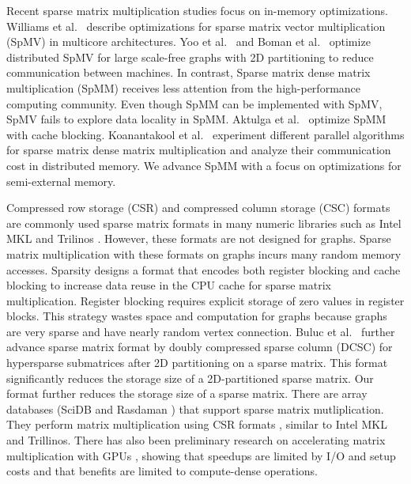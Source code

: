 Recent sparse matrix multiplication studies focus on in-memory optimizations.
Williams et al.~\cite{Williams07} describe optimizations for sparse matrix
vector multiplication (SpMV) in multicore architectures. Yoo et al.~\cite{Yoo11}
and Boman et al.~\cite{Boman2013} optimize distributed SpMV for large
scale-free graphs with 2D partitioning to reduce communication between
machines. In contrast, Sparse matrix dense matrix multiplication (SpMM) receives
less attention from the high-performance computing community. Even though
SpMM can be implemented with SpMV, SpMV fails to explore data locality in
SpMM. Aktulga et al.~\cite{Aktulga14} optimize SpMM with cache blocking.
Koanantakool et al.~\cite{Koanantakool16} experiment different parallel
algorithms for sparse matrix dense matrix multiplication and analyze
their communication cost in distributed memory.
We advance SpMM with a focus on optimizations for semi-external memory.

Compressed row storage (CSR) and compressed column storage (CSC) formats are commonly
used sparse matrix formats in many numeric libraries such as Intel MKL \cite{mkl}
and Trilinos \cite{trilinos}. However, these formats are not designed for graphs.
Sparse matrix multiplication with these formats on graphs incurs many random memory
accesses. %
Sparsity \cite{Im04} designs a format that encodes both register blocking and cache blocking to
increase data reuse in the CPU cache for sparse matrix multiplication. Register blocking
requires explicit storage of zero values in register blocks. This strategy
wastes space and computation for graphs because graphs are very
sparse and have nearly random vertex connection. Buluc et al.~\cite{Buluc08}
further advance sparse matrix format
by doubly compressed sparse column (DCSC) for hypersparse submatrices after 2D
partitioning on a sparse matrix. This format significantly reduces the storage
size of a 2D-partitioned sparse matrix. Our format further reduces the storage
size of a sparse matrix. There are array databases (SciDB \cite{scidb} and
Rasdaman \cite{rasdaman}) that support
sparse matrix mutliplication. They perform matrix multiplication using CSR
formats \cite{SLACID}, similar to Intel MKL and Trillinos.  There has also been
preliminary research on accelerating matrix multiplication with GPUs \cite{Liu14},
showing that speedups are limited by I/O and setup costs and that benefits
are limited to compute-dense operations.


